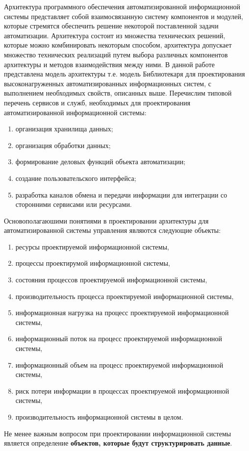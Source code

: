 Архитектура программного обеспечения автоматизированной информационной системы представляет собой взаимосвязанную систему компонентов и модулей, которые стремятся обеспечить решение некоторой поставленной задачи автоматизации. Архитектура состоит из множества технических решений, которые можно комбинировать некоторым способом, архитектура допускает множество технических реализаций путем выбора различных компонентов архитектуры и методов взаимодействия между ними. В данной работе представлена модель архитектуры т.е. модель Библиотекаря для проектирования высоконагруженных автоматизированных информационных систем, с выполнением необходимых свойств, описанных выше.  
Перечислим типовой перечень сервисов и служб, необходимых для проектирования автоматизированной информационной системы:
\begin{enumerate}
	\item организация хранилища данных;
	\item организация обработки данных;
	\item формирование деловых функций объекта автоматизации;
	\item создание пользовательского интерфейса;
	\item разработка каналов обмена и передачи информации для интеграции со сторонними сервисами или ресурсами.
\end{enumerate}
Основополагаюшими понятиями в проектировании архитектуры для автоматизированной системы управления являются следующие объекты:
\begin{enumerate}
	\item ресурсы проектируемой информационной системы,
	\item процессы проектирумой информационной системы,
	\item состояния процессов проектируемой информационной системы,
	\item производительность процесса проектируемой информационной системы,
	\item информационная нагрузка на процесс проектируемой информационной системы,
	\item информационный поток на процесс проектируемой информационной системы,
	\item информационный объем на процесс проектируемой информационной системы,
	\item риск потери информации в процессах проектируемой информационной системы,
	\item производительность информационной системы в целом.
\end{enumerate}
Не менее важным вопросом при проектировании информационной системы является определение \textbf{объектов, которые будут структурировать данные}.


